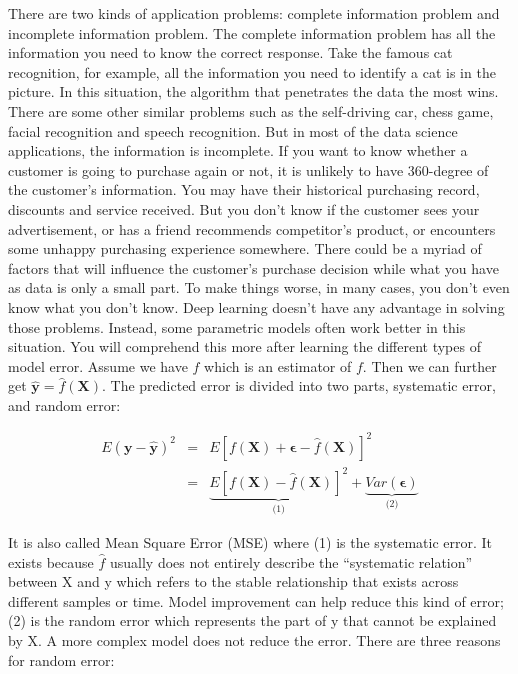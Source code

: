 \documentclass[
  12pt,
]{krantz}
\begin{document}
There are two kinds of application problems: complete information problem and incomplete information problem. The complete information problem has all the information you need to know the correct response. Take the famous cat recognition, for example, all the information you need to identify a cat is in the picture. In this situation, the algorithm that penetrates the data the most wins. There are some other similar problems such as the self-driving car, chess game, facial recognition and speech recognition. But in most of the data science applications, the information is incomplete. If you want to know whether a customer is going to purchase again or not, it is unlikely to have 360-degree of the customer's information. You may have their historical purchasing record, discounts and service received. But you don't know if the customer sees your advertisement, or has a friend recommends competitor's product, or encounters some unhappy purchasing experience somewhere. There could be a myriad of factors that will influence the customer's purchase decision while what you have as data is only a small part. To make things worse, in many cases, you don't even know what you don't know. Deep learning doesn't have any advantage in solving those problems. Instead, some parametric models often work better in this situation. You will comprehend this more after learning the different types of model error.
Assume we have \(\hat{f}\) which is an estimator of \(f\). Then we can further get \(\symbf{\hat{y}}=\hat{f}(\mathbf{X})\). The predicted error is divided into two parts, systematic error, and random error:

\begin{equation}
\begin{array}{ccc}
E(\mathbf{y}-\hat{\mathbf{y}})^{2} & = & E[f(\mathbf{X})+ \symbf{\epsilon} - \hat{f}(\mathbf{X})]^{2}\\
 & = & \underset{\text{(1)}}{\underbrace{E[f(\mathbf{X})-\hat{f}(\mathbf{X})]^{2}}}+\underset{\text{(2)}}{\underbrace{Var(\symbf{\epsilon})}}
\end{array}
\label{eq:error}
\end{equation}

It is also called Mean Square Error (MSE) where (1) is the systematic error. It exists because \(\hat{f}\) usually does not entirely describe the ``systematic relation'' between X and y which refers to the stable relationship that exists across different samples or time. Model improvement can help reduce this kind of error; (2) is the random error which represents the part of y that cannot be explained by X. A more complex model does not reduce the error. There are three reasons for random error:
\end{document}
